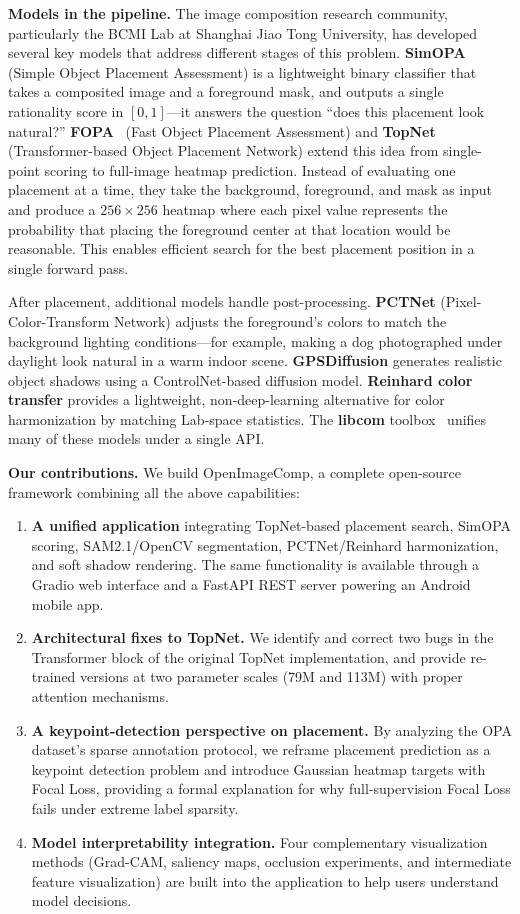 \documentclass[10pt,twocolumn]{article}
\begin{document}
\textbf{Models in the pipeline.} The image composition research community, particularly the BCMI Lab at Shanghai Jiao Tong University, has developed several key models that address different stages of this problem. \textbf{SimOPA}~\cite{liu2021OPA} (Simple Object Placement Assessment) is a lightweight binary classifier that takes a composited image and a foreground mask, and outputs a single rationality score in $[0,1]$---it answers the question ``does this placement look natural?'' \textbf{FOPA}~\cite{fopa} (Fast Object Placement Assessment) and \textbf{TopNet}~\cite{topnet} (Transformer-based Object Placement Network) extend this idea from single-point scoring to full-image heatmap prediction. Instead of evaluating one placement at a time, they take the background, foreground, and mask as input and produce a $256\times 256$ heatmap where each pixel value represents the probability that placing the foreground center at that location would be reasonable. This enables efficient search for the best placement position in a single forward pass.

After placement, additional models handle post-processing. \textbf{PCTNet} (Pixel-Color-Transform Network) adjusts the foreground's colors to match the background lighting conditions---for example, making a dog photographed under daylight look natural in a warm indoor scene. \textbf{GPSDiffusion} generates realistic object shadows using a ControlNet-based diffusion model. \textbf{Reinhard color transfer} provides a lightweight, non-deep-learning alternative for color harmonization by matching Lab-space statistics. The \textbf{libcom} toolbox~\cite{libcom} unifies many of these models under a single API.

\textbf{Our contributions.} We build OpenImageComp, a complete open-source framework combining all the above capabilities:

\begin{enumerate}
    \item \textbf{A unified application} integrating TopNet-based placement search, SimOPA scoring, SAM2.1/OpenCV segmentation, PCTNet/Reinhard harmonization, and soft shadow rendering. The same functionality is available through a Gradio web interface and a FastAPI REST server powering an Android mobile app.
    \item \textbf{Architectural fixes to TopNet.} We identify and correct two bugs in the Transformer block of the original TopNet implementation, and provide re-trained versions at two parameter scales (79M and 113M) with proper attention mechanisms.
    \item \textbf{A keypoint-detection perspective on placement.} By analyzing the OPA dataset's sparse annotation protocol, we reframe placement prediction as a keypoint detection problem and introduce Gaussian heatmap targets with Focal Loss, providing a formal explanation for why full-supervision Focal Loss fails under extreme label sparsity.
    \item \textbf{Model interpretability integration.} Four complementary visualization methods (Grad-CAM, saliency maps, occlusion experiments, and intermediate feature visualization) are built into the application to help users understand model decisions.
\end{enumerate}
\end{document}
